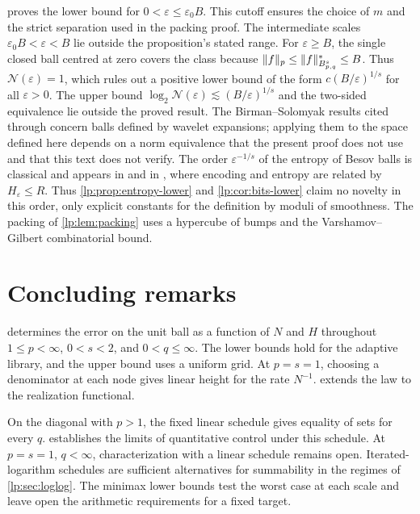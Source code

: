\documentclass[11pt,a4paper]{article}
\begin{document}
\begin{observacao}
\label{lp:obs:entropy}
 proves the lower bound for $0<\varepsilon\le\varepsilon_0B$. This cutoff ensures the choice of $m$ and the strict separation used in the packing proof. The intermediate scales $\varepsilon_0B<\varepsilon<B$ lie outside the proposition's stated range. For $\varepsilon\ge B$, the single closed ball centred at zero covers the class because $\|f\|_p\le\|f\|^*_{B^{s}_{p,q}}\le B$. Thus $\mathcal N(\varepsilon)=1$, which rules out a positive lower bound of the form $c(B/\varepsilon)^{1/s}$ for all $\varepsilon>0$. The upper bound $\log_2\mathcal N(\varepsilon)\lesssim(B/\varepsilon)^{1/s}$ and the two-sided equivalence lie outside the proved result. The Birman--Solomyak results cited through \citet[Theorem~1]{lp-kerkyacharianpicard2003} concern balls defined by wavelet expansions; applying them to the space defined here depends on a norm equivalence that the present proof does not use and that this text does not verify. The order $\varepsilon^{-1/s}$ of the entropy of Besov balls is classical \citep{lp-birmansolomyak1967} and appears in \citet{lp-kerkyacharianpicard2003} and in \citet[Theorem~1.1]{lp-cohen2001}, where encoding and entropy are related by $H_\varepsilon\le R$. Thus \cref{lp:prop:entropy-lower} and \cref{lp:cor:bits-lower} claim no novelty in this order, only explicit constants for the definition by moduli of smoothness. The packing of \cref{lp:lem:packing} uses a hypercube of bumps and the Varshamov--Gilbert combinatorial bound.
\end{observacao}

\section{Concluding remarks}
 determines the error on the unit ball as a function of $N$ and $H$ throughout $1\le p<\infty$, $0<s<2$, and $0<q\le\infty$. The lower bounds hold for the adaptive library, and the upper bound uses a uniform grid. At $p=s=1$, choosing a denominator at each node gives linear height for the rate $N^{-1}$.  extends the law to the realization functional.

On the diagonal with $p>1$, the fixed linear schedule gives equality of sets for every $q$.  establishes the limits of quantitative control under this schedule. At $p=s=1$, $q<\infty$, characterization with a linear schedule remains open. Iterated-logarithm schedules are sufficient alternatives for summability in the regimes of \cref{lp:sec:loglog}. The minimax lower bounds test the worst case at each scale and leave open the arithmetic requirements for a fixed target.
\end{document}
